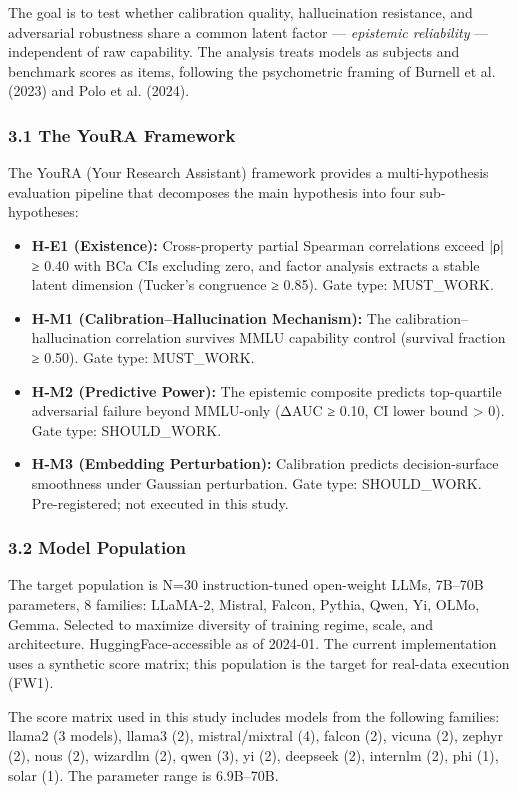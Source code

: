 
The goal is to test whether calibration quality, hallucination resistance, and adversarial robustness share a common latent factor — \textit{epistemic reliability} — independent of raw capability. The analysis treats models as subjects and benchmark scores as items, following the psychometric framing of Burnell et al. (2023) and Polo et al. (2024).

\subsubsection{3.1 The YouRA Framework}

The YouRA (Your Research Assistant) framework provides a multi-hypothesis evaluation pipeline that decomposes the main hypothesis into four sub-hypotheses:

\begin{itemize}
\item \textbf{H-E1 (Existence):} Cross-property partial Spearman correlations exceed |ρ| ≥ 0.40 with BCa CIs excluding zero, and factor analysis extracts a stable latent dimension (Tucker's congruence ≥ 0.85). Gate type: MUST_WORK.
\item \textbf{H-M1 (Calibration–Hallucination Mechanism):} The calibration–hallucination correlation survives MMLU capability control (survival fraction ≥ 0.50). Gate type: MUST_WORK.
\item \textbf{H-M2 (Predictive Power):} The epistemic composite predicts top-quartile adversarial failure beyond MMLU-only (ΔAUC ≥ 0.10, CI lower bound > 0). Gate type: SHOULD_WORK.
\item \textbf{H-M3 (Embedding Perturbation):} Calibration predicts decision-surface smoothness under Gaussian perturbation. Gate type: SHOULD_WORK. Pre-registered; not executed in this study.
\end{itemize}

\subsubsection{3.2 Model Population}

The target population is N=30 instruction-tuned open-weight LLMs, 7B–70B parameters, 8 families: LLaMA-2, Mistral, Falcon, Pythia, Qwen, Yi, OLMo, Gemma. Selected to maximize diversity of training regime, scale, and architecture. HuggingFace-accessible as of 2024-01. The current implementation uses a synthetic score matrix; this population is the target for real-data execution (FW1).

The score matrix used in this study includes models from the following families: llama2 (3 models), llama3 (2), mistral/mixtral (4), falcon (2), vicuna (2), zephyr (2), nous (2), wizardlm (2), qwen (3), yi (2), deepseek (2), internlm (2), phi (1), solar (1). The parameter range is 6.9B–70B.

